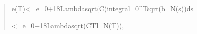 \documentclass[
]{article}
\begin{document}
\begin{quote}\small\ttfamily\raggedright\setlength{\parskip}{0pt}
\noindent e\allowbreak{}(\allowbreak{}T\allowbreak{})\allowbreak{}\hspace*{0.525em}\allowbreak{}<\allowbreak{}=\allowbreak{}\hspace*{0.525em}\allowbreak{}e\allowbreak{}\_\allowbreak{}0\allowbreak{}\hspace*{0.525em}\allowbreak{}+\allowbreak{}\hspace*{0.525em}\allowbreak{}1\allowbreak{}8\allowbreak{}\hspace*{0.525em}\allowbreak{}L\allowbreak{}a\allowbreak{}m\allowbreak{}b\allowbreak{}d\allowbreak{}a\allowbreak{}\hspace*{0.525em}\allowbreak{}s\allowbreak{}q\allowbreak{}r\allowbreak{}t\allowbreak{}(\allowbreak{}C\allowbreak{})\allowbreak{}\hspace*{0.525em}\allowbreak{}i\allowbreak{}n\allowbreak{}t\allowbreak{}e\allowbreak{}g\allowbreak{}r\allowbreak{}a\allowbreak{}l\allowbreak{}\_\allowbreak{}0\allowbreak{}\^{}\allowbreak{}T\allowbreak{}\hspace*{0.525em}\allowbreak{}s\allowbreak{}q\allowbreak{}r\allowbreak{}t\allowbreak{}(\allowbreak{}b\allowbreak{}\_\allowbreak{}N\allowbreak{}(\allowbreak{}s\allowbreak{})\allowbreak{})\allowbreak{}\hspace*{0.525em}\allowbreak{}d\allowbreak{}s\par
\noindent \hspace*{0.525em}\allowbreak{}\hspace*{0.525em}\allowbreak{}\hspace*{0.525em}\allowbreak{}\hspace*{0.525em}\allowbreak{}\hspace*{0.525em}\allowbreak{}<\allowbreak{}=\allowbreak{}\hspace*{0.525em}\allowbreak{}e\allowbreak{}\_\allowbreak{}0\allowbreak{}\hspace*{0.525em}\allowbreak{}+\allowbreak{}\hspace*{0.525em}\allowbreak{}1\allowbreak{}8\allowbreak{}\hspace*{0.525em}\allowbreak{}L\allowbreak{}a\allowbreak{}m\allowbreak{}b\allowbreak{}d\allowbreak{}a\allowbreak{}\hspace*{0.525em}\allowbreak{}s\allowbreak{}q\allowbreak{}r\allowbreak{}t\allowbreak{}(\allowbreak{}C\allowbreak{}\hspace*{0.525em}\allowbreak{}T\allowbreak{}\hspace*{0.525em}\allowbreak{}I\allowbreak{}\_\allowbreak{}N\allowbreak{}(\allowbreak{}T\allowbreak{})\allowbreak{})\allowbreak{},\par

\end{quote}
\end{document}
